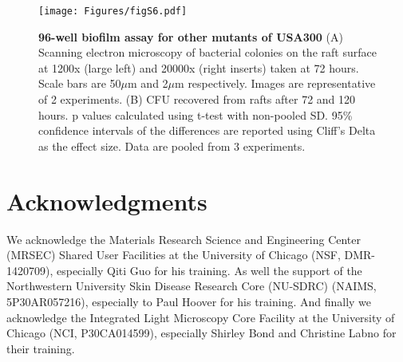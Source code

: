 \documentclass[10pt,letterpaper]{article}
\begin{document}
\begin{figure}[H]
\begin{adjustwidth}{-2.25in}{0in}
\texttt{[image: Figures/figS6.pdf]}
\caption[96-well biofilm assay for other mutants of USA300]{
	\textbf{96-well biofilm assay for other mutants of USA300}
	(A) Scanning electron microscopy of bacterial colonies on the raft surface at 1200x (large left) and 20000x (right inserts) taken at 72 hours. Scale bars are 50$\mu$m and 2$\mu$m respectively. Images are representative of 2 experiments.
	(B) CFU recovered from rafts after 72 and 120 hours. p values calculated using t-test with non-pooled SD. 95\% confidence intervals of the differences are reported using Cliff's Delta as the effect size. Data are pooled from 3 experiments.}
        \label{figS6}
        \end{adjustwidth}
\end{figure}

\section*{Acknowledgments}
We acknowledge the Materials Research Science and Engineering Center (MRSEC) Shared User Facilities at the University of Chicago (NSF, DMR-1420709), especially Qiti Guo for his training.
As well the support of the Northwestern University Skin Disease Research Core (NU-SDRC) (NAIMS, 5P30AR057216), especially to Paul Hoover for his training.
And finally we acknowledge the Integrated Light Microscopy Core Facility at the University of Chicago (NCI, P30CA014599), especially Shirley Bond and Christine Labno for their training.

%
%
% 

\nolinenumbers
\FloatBarrier



%
%
% 
\end{document}
